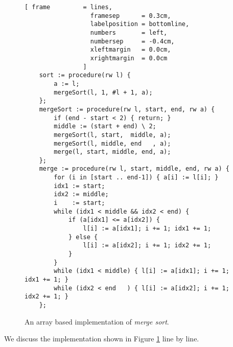 \begin{figure}[!ht]
  \centering
\begin{Verbatim}[ frame         = lines, 
                  framesep      = 0.3cm, 
                  labelposition = bottomline,
                  numbers       = left,
                  numbersep     = -0.4cm,
                  xleftmargin   = 0.0cm,
                  xrightmargin  = 0.0cm
                ]
    sort := procedure(rw l) {
        a := l;
        mergeSort(l, 1, #l + 1, a); 
    };
    mergeSort := procedure(rw l, start, end, rw a) {
        if (end - start < 2) { return; }
        middle := (start + end) \ 2;
        mergeSort(l, start,  middle, a);  
        mergeSort(l, middle, end   , a);    
        merge(l, start, middle, end, a); 
    };
    merge := procedure(rw l, start, middle, end, rw a) {    
        for (i in [start .. end-1]) { a[i] := l[i]; }
        idx1 := start;
        idx2 := middle;
        i    := start;
        while (idx1 < middle && idx2 < end) {
            if (a[idx1] <= a[idx2]) {
                l[i] := a[idx1]; i += 1; idx1 += 1;
            } else {
                l[i] := a[idx2]; i += 1; idx2 += 1;
            }
        }
        while (idx1 < middle) { l[i] := a[idx1]; i += 1; idx1 += 1; }
        while (idx2 < end   ) { l[i] := a[idx2]; i += 1; idx2 += 1; }
    };
\end{Verbatim}
\vspace*{-0.3cm}
  \caption{An array based implementation of \emph{merge sort}.}
  \label{fig:merge-sort-array.stlx}
\end{figure}
We discuss the implementation shown in Figure \ref{fig:merge-sort-array.stlx} line by line.
